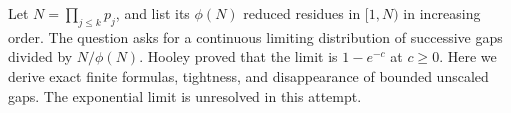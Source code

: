 Let $N=\prod_{j\leq k}p_j$, and list its $\phi(N)$ reduced residues
in $[1,N)$ in increasing order. The question asks for a continuous
limiting distribution of successive gaps divided by $N/\phi(N)$.
Hooley proved that the limit is $1-e^{-c}$ at $c\geq0$.
Here we derive exact finite formulas, tightness, and disappearance
of bounded unscaled gaps. The exponential limit is unresolved
in this attempt.
